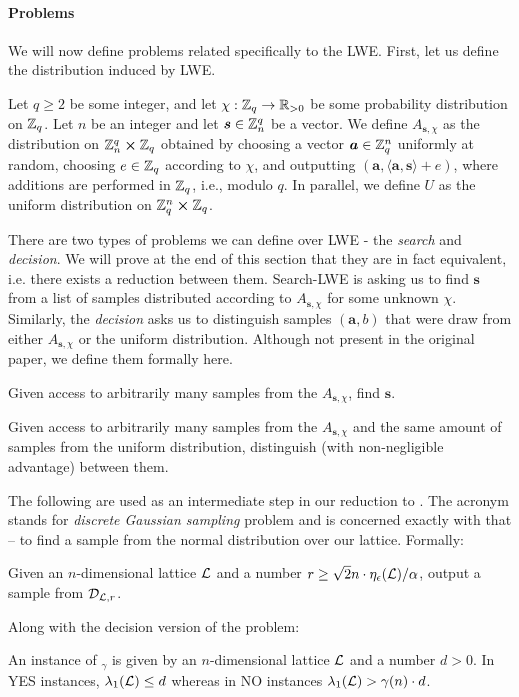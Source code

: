 \paragraph{Problems}
We will now define problems related specifically to the LWE. First, let us define the distribution induced by LWE. 
\begin{definition}\label{lwe-distr}
        Let $q \geq 2$ be some integer, and let $\chi : \mathbb{Z}_q \rightarrow \mathbb{R}_{>0}$ be some probability distribution on $\mathbb{Z}_q$. Let $n$ be an integer and let $\boldsymbol{s} \in \mathbb{Z}_n^q$ be a vector. We define $A_{\bm{s},\chi}$ as the distribution on $\mathbb{Z}_n^q \cross \mathbb{Z}_q$ obtained by choosing a vector $\boldsymbol{a} \in \mathbb{Z}_q^n$ uniformly at random, choosing $e \in \mathbb{Z}_q$ according to $\chi$, and outputting $(\bm{a}, \langle \bm{a}, \bm{s} \rangle + e)$, where additions are performed in $\mathbb{Z}_q$, i.e., modulo $q$. In parallel, we define $U$ as the uniform distribution on $\mathbb{Z}_q^n \cross \mathbb{Z}_q$.
\end{definition}

There are two types of problems we can define over LWE - the \textit{search} and \textit{decision}. We will prove at the end of this section that they are in fact equivalent, i.e. there exists a reduction between them. Search-LWE is asking us to find $\bm{s}$ from a list of samples distributed according to $A_{\bm{s}, \chi}$ for some unknown $\chi$. Similarly, the \textit{decision} asks us to distinguish samples $(\bm{a}, b)$ that were draw from either $A_{\bm{s}, \chi}$ or the uniform distribution. Although not present in the original paper, we define them formally here.
\begin{definition}\label{slwe}
        Given access to arbitrarily many samples from the $A_{\bm{s}, \chi}$, find $\bm{s}$.
\end{definition}
\begin{definition}\label{dlwe}
        Given access to arbitrarily many samples from the $A_{\bm{s}, \chi}$ and the same amount of samples from the uniform distribution, distinguish (with non-negligible advantage) between them.
\end{definition}
The following are used as an intermediate step in our reduction to . The acronym  stands for \textit{discrete Gaussian sampling} problem and is concerned exactly with that -- to find a sample from the normal distribution over our lattice. Formally:
\begin{definition}\label{dgs}
        Given an $n$-dimensional lattice $\mathcal{L}$ and a number $r \geq \sqrt{2}n \cdot \eta_{\epsilon}(\mathcal{L})/\alpha$, output a sample from $\mathcal{D}_{\mathcal{L},r}$.
\end{definition}
Along with the decision version of the  problem:
\begin{definition}
	An instance of $_{\gamma}$ is given by an $n$-dimensional lattice $\mathcal{L}$ and a number $d > 0$. In YES instances, $\lambda_1(\mathcal{L}) \leq d$ whereas in NO instances $\lambda_1(\mathcal{L}) > \gamma(n) \cdot d$.
\end{definition}

